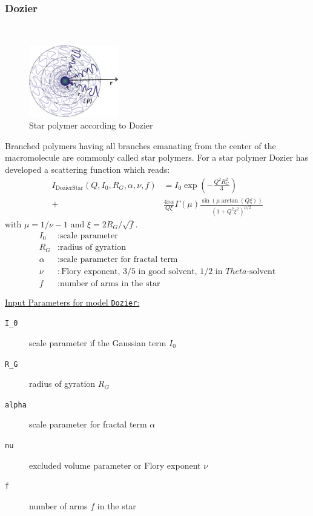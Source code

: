 \subsubsection{Dozier}
\label{sect:DozierStar1}
~\\
\begin{figure}[htb]
\begin{center}
\includegraphics[width=0.346\textwidth,height=0.278\textwidth]{Dozier.png}
\end{center}
\caption{Star polymer according to Dozier} \label{fig:DozierStar}
\end{figure}
Branched polymers having all branches emanating from
the center of the macromolecule are commonly called star
polymers. For a star polymer Dozier \cite{dozier91} has developed
a scattering function which reads:
\begin{align}
I_\text{DozierStar}(Q,I_0,R_G,\alpha,\nu,f)
& = I_0 \exp\left(-\frac{Q^2R_G^2}{3}\right) \\
+& \frac{4\pi\alpha}{Q\xi} \Gamma(\mu)
\frac{\sin(\mu\arctan(Q\xi))}{(1+Q^2\xi^2)^{\mu/2}} \nonumber
\end{align}
with $\mu=1/\nu-1$ and $\xi=2R_G/\sqrt{f}$.
\begin{align}
I_0      & : \text{scale parameter} \nonumber \\
R_G      & : \text{radius of gyration} \nonumber \\
\alpha   & : \text{scale parameter for fractal term} \nonumber \\
\nu      & : \text{Flory exponent, 3/5 in good solvent, 1/2 in $Theta$-solvent} \nonumber \\
f        & : \text{number of arms in the star} \nonumber
\end{align}

\vspace{5mm}

\noindent
\uline{Input Parameters for model \texttt{Dozier}:}
\begin{description}
\item[\texttt{I\_0}] scale parameter if the Gaussian term $I_0$
\item[\texttt{R\_G}] radius of gyration $R_G$
\item[\texttt{alpha}] scale parameter for fractal term $\alpha$
\item[\texttt{nu}] excluded volume parameter or Flory exponent $\nu$
\item[\texttt{f}]  number of arms $f$ in the star
\end{description}
\vspace{5mm}

